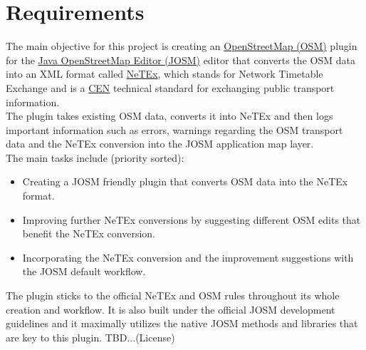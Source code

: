 \section{Requirements}
The main objective for this project is creating an \href{https://en.wikipedia.org/wiki/OpenStreetMap}{OpenStreetMap (OSM)} plugin for the \href{https://josm.openstreetmap.de/}{Java OpenStreetMap Editor (JOSM)} editor that converts the OSM data into an XML format called \href{https://en.wikipedia.org/wiki/NeTEx}{NeTEx}, which stands for Network Timetable Exchange and is a \href{https://en.wikipedia.org/wiki/European_Committee_for_Standardization}{CEN} technical standard for exchanging public transport information.\\
The plugin takes existing OSM data, converts it into NeTEx and then logs important information such as errors, warnings regarding the OSM transport data and the NeTEx conversion into the JOSM application map layer.\\
\newline
The main tasks include (priority sorted): 
\begin{itemize}
	\item Creating a JOSM friendly plugin that converts OSM data into the NeTEx format.
	\item Improving further NeTEx conversions by suggesting different OSM edits that benefit the NeTEx conversion.
	\item Incorporating the NeTEx conversion and the improvement suggestions with the JOSM default workflow.
\end{itemize}
The plugin sticks to the official NeTEx and OSM rules throughout its whole creation and workflow. It is also built under the official JOSM development guidelines and it maximally utilizes the native JOSM methods and libraries that are key to this plugin.
TBD...(License)
\newpage
